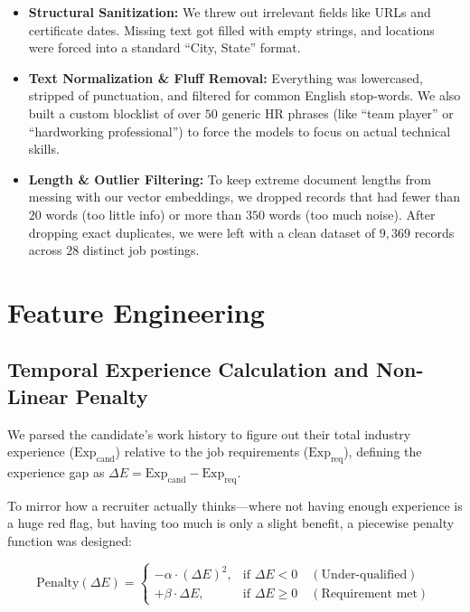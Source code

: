 \documentclass[12pt,a4paper,oneside]{report}
\begin{document}
\begin{itemize}
    \item \textbf{Structural Sanitization:} We threw out irrelevant fields like URLs and certificate dates. Missing text got filled with empty strings, and locations were forced into a standard ``City, State'' format.
    
    \item \textbf{Text Normalization \& Fluff Removal:} Everything was lowercased, stripped of punctuation, and filtered for common English stop-words. We also built a custom blocklist of over $50$ generic HR phrases (like ``team player'' or ``hardworking professional'') to force the models to focus on actual technical skills.
    
    \item \textbf{Length \& Outlier Filtering:} To keep extreme document lengths from messing with our vector embeddings, we dropped records that had fewer than $20$ words (too little info) or more than $350$ words (too much noise). After dropping exact duplicates, we were left with a clean dataset of $9,369$ records across $28$ distinct job postings.
\end{itemize}

\section{Feature Engineering}

\subsection{Temporal Experience Calculation and Non-Linear Penalty}

We parsed the candidate's work history to figure out their total industry experience ($\text{Exp}_{\text{cand}}$) relative to the job requirements ($\text{Exp}_{\text{req}}$), defining the experience gap as $\Delta E = \text{Exp}_{\text{cand}} - \text{Exp}_{\text{req}}$. 

To mirror how a recruiter actually thinks—where not having enough experience is a huge red flag, but having too much is only a slight benefit, a piecewise penalty function was designed:

\begin{equation}
\text{Penalty}(\Delta E) = 
\begin{cases} 
-\alpha \cdot (\Delta E)^2, & \text{if } \Delta E < 0 \quad (\text{Under-qualified}) \\
+\beta \cdot \Delta E, & \text{if } \Delta E \ge 0 \quad (\text{Requirement met})
\end{cases}
\end{equation}
\end{document}
